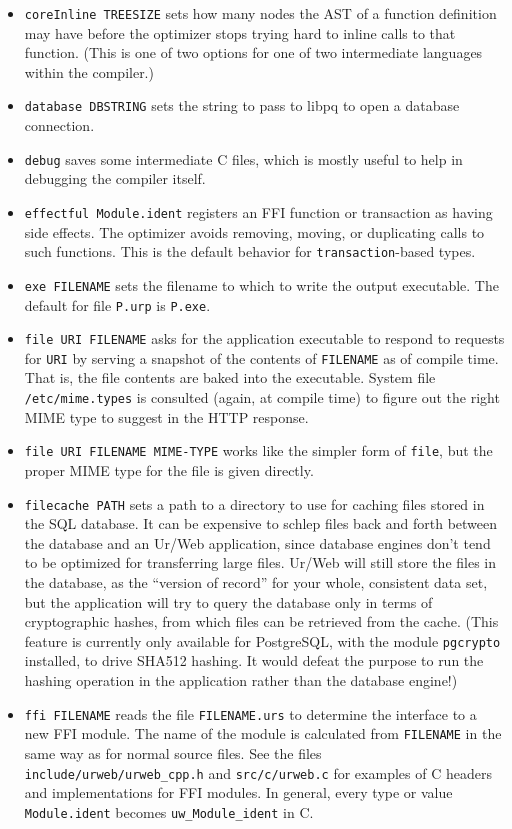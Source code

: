 \documentclass{article}
\begin{document}
\begin{itemize}
\item \texttt{coreInline TREESIZE} sets how many nodes the AST of a function definition may have before the optimizer stops trying hard to inline calls to that function.  (This is one of two options for one of two intermediate languages within the compiler.)
\item \texttt{database DBSTRING} sets the string to pass to libpq to open a database connection.
\item \texttt{debug} saves some intermediate C files, which is mostly useful to help in debugging the compiler itself.
\item \texttt{effectful Module.ident} registers an FFI function or transaction as having side effects.  The optimizer avoids removing, moving, or duplicating calls to such functions.  This is the default behavior for \texttt{transaction}-based types.
\item \texttt{exe FILENAME} sets the filename to which to write the output executable.  The default for file \texttt{P.urp} is \texttt{P.exe}.
\item \texttt{file URI FILENAME} asks for the application executable to respond to requests for \texttt{URI} by serving a snapshot of the contents of \texttt{FILENAME} as of compile time.  That is, the file contents are baked into the executable.  System file \texttt{/etc/mime.types} is consulted (again, at compile time) to figure out the right MIME type to suggest in the HTTP response.
\item \texttt{file URI FILENAME MIME-TYPE} works like the simpler form of \texttt{file}, but the proper MIME type for the file is given directly.
\item \texttt{filecache PATH} sets a path to a directory to use for caching files stored in the SQL database.  It can be expensive to schlep files back and forth between the database and an Ur/Web application, since database engines don't tend to be optimized for transferring large files.  Ur/Web will still store the files in the database, as the ``version of record'' for your whole, consistent data set, but the application will try to query the database only in terms of cryptographic hashes, from which files can be retrieved from the cache.  (This feature is currently only available for PostgreSQL, with the module \texttt{pgcrypto} installed, to drive SHA512 hashing.  It would defeat the purpose to run the hashing operation in the application rather than the database engine!)
\item \texttt{ffi FILENAME} reads the file \texttt{FILENAME.urs} to determine the interface to a new FFI module.  The name of the module is calculated from \texttt{FILENAME} in the same way as for normal source files.  See the files \texttt{include/urweb/urweb\_cpp.h} and \texttt{src/c/urweb.c} for examples of C headers and implementations for FFI modules.  In general, every type or value \texttt{Module.ident} becomes \texttt{uw\_Module\_ident} in C.

\end{itemize}
\end{document}
